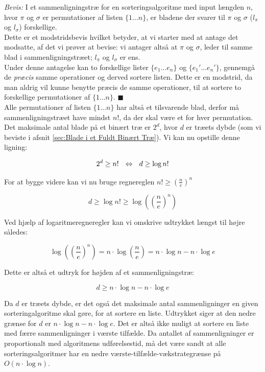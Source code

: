 \emph{Bevis:} I et sammenligningstræ for en sorteringsalgoritme med input længden $n$, hvor $\pi$ og $\sigma$ er permutationer af listen $\{1 \dots n\}$, er bladene der svarer til $\pi$ og $\sigma$ ($l_{\pi}$ og $l_{\sigma}$) forskellige.\\

Dette er et modstridsbevis hvilket betyder, at vi starter med at antage det modsatte, af det vi prøver at bevise: vi antager altså at $\pi$ og $\sigma$, leder til samme blad i sammenligningstræet; $l_{\pi}$ og $l_{\sigma}$ er ens.\\

Under denne antagelse kan to forskellige lister $\{e_1 \dots e_n\}$ og $\{e_1' \dots e_n'\}$, gennemgå de \emph{præcis} samme operationer og derved sortere listen. Dette er en modstrid, da man aldrig vil kunne benytte præcis de samme operationer, til at sortere to forskellige permutationer af $\{1 \dots n\}$. $\blacksquare$ \\


Alle permutationer af listen $\{1 \dots n\}$ har altså et tilsvarende blad, derfor må sammenligningstræet have mindst $n!$, da der skal være et for hver permutation.\\

Det maksimale antal blade på et binært træ er $2^d$, hvor $d$ er træets dybde (som vi beviste i afsnit \ref{sec:Blade i et Fuldt Binært Træ}). Vi kan nu opstille denne ligning:


$$2^d \geq n! \:\:\:\Leftrightarrow\:\:\: d \geq \log n!$$

For at bygge videre kan vi nu bruge regnereglen $n! \geq \left( \frac{n}{e} \right)^n$

$$d \geq \log n! \geq \log \left(\left(\frac{n}{e}\right)^n\right)$$

Ved hjælp af logaritmeregneregler kan vi omskrive udtrykket længst til højre således:

$$\log \left(\left(\frac{n}{e}\right)^n\right) = n \cdot \log \left(\frac{n}{e} \right) = n \cdot \log n - n \cdot \log e$$

Dette er altså et udtryk for højden af et sammenligningstræ:

$$d \geq n \cdot \log n - n \cdot \log e$$

Da $d$ er træets dybde, er det også det maksimale antal sammenligninger en given sorteringalgoritme skal gøre, for at sortere en liste. Udtrykket siger at den nedre grænse for $d$ er $n \cdot \log n - n \cdot \log e$. Det er altså ikke muligt at sortere en liste med færre sammenligninger i værste tilfælde. Da antallet af sammenligninger er proportionalt med algoritmens udførelsestid, må det være sandt at alle sorteringsalgoritmer har en nedre værste-tilfælde-vækstrategrænse på $O(n \cdot \log n)$.



